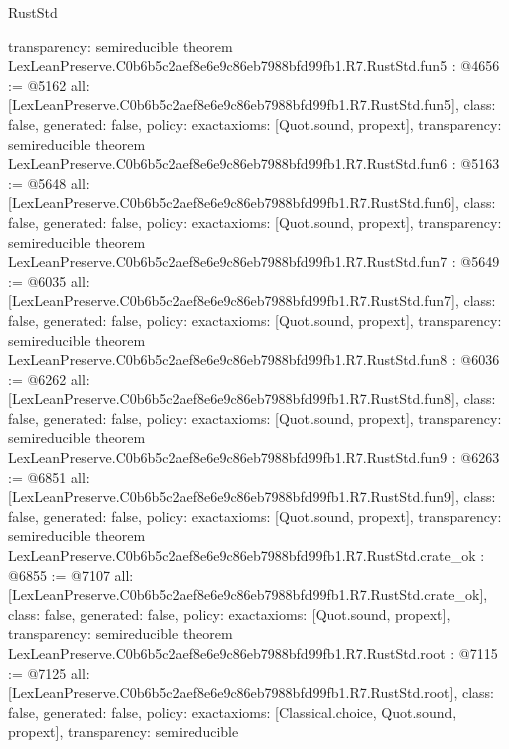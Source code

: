 \begin{lexlean}{RustStd}
\begin{coremodule}
{  transparency: semireducible
}
theorem LexLeanPreserve.C0b6b5c2aef8e6e9c86eb7988bfd99fb1.R7.RustStd.fun5 : @4656 := @5162 {
  all: [LexLeanPreserve.C0b6b5c2aef8e6e9c86eb7988bfd99fb1.R7.RustStd.fun5],
  class: false,
  generated: false,
  policy: exact{axioms: [Quot.sound, propext]},
  transparency: semireducible
}
theorem LexLeanPreserve.C0b6b5c2aef8e6e9c86eb7988bfd99fb1.R7.RustStd.fun6 : @5163 := @5648 {
  all: [LexLeanPreserve.C0b6b5c2aef8e6e9c86eb7988bfd99fb1.R7.RustStd.fun6],
  class: false,
  generated: false,
  policy: exact{axioms: [Quot.sound, propext]},
  transparency: semireducible
}
theorem LexLeanPreserve.C0b6b5c2aef8e6e9c86eb7988bfd99fb1.R7.RustStd.fun7 : @5649 := @6035 {
  all: [LexLeanPreserve.C0b6b5c2aef8e6e9c86eb7988bfd99fb1.R7.RustStd.fun7],
  class: false,
  generated: false,
  policy: exact{axioms: [Quot.sound, propext]},
  transparency: semireducible
}
theorem LexLeanPreserve.C0b6b5c2aef8e6e9c86eb7988bfd99fb1.R7.RustStd.fun8 : @6036 := @6262 {
  all: [LexLeanPreserve.C0b6b5c2aef8e6e9c86eb7988bfd99fb1.R7.RustStd.fun8],
  class: false,
  generated: false,
  policy: exact{axioms: [Quot.sound, propext]},
  transparency: semireducible
}
theorem LexLeanPreserve.C0b6b5c2aef8e6e9c86eb7988bfd99fb1.R7.RustStd.fun9 : @6263 := @6851 {
  all: [LexLeanPreserve.C0b6b5c2aef8e6e9c86eb7988bfd99fb1.R7.RustStd.fun9],
  class: false,
  generated: false,
  policy: exact{axioms: [Quot.sound, propext]},
  transparency: semireducible
}
theorem LexLeanPreserve.C0b6b5c2aef8e6e9c86eb7988bfd99fb1.R7.RustStd.crate_ok : @6855 := @7107 {
  all: [LexLeanPreserve.C0b6b5c2aef8e6e9c86eb7988bfd99fb1.R7.RustStd.crate_ok],
  class: false,
  generated: false,
  policy: exact{axioms: [Quot.sound, propext]},
  transparency: semireducible
}
theorem LexLeanPreserve.C0b6b5c2aef8e6e9c86eb7988bfd99fb1.R7.RustStd.root : @7115 := @7125 {
  all: [LexLeanPreserve.C0b6b5c2aef8e6e9c86eb7988bfd99fb1.R7.RustStd.root],
  class: false,
  generated: false,
  policy: exact{axioms: [Classical.choice, Quot.sound, propext]},
  transparency: semireducible
}


\end{coremodule}
\end{lexlean}
